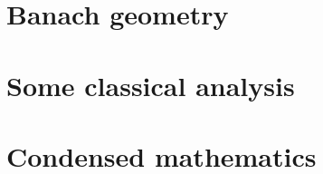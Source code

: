         
        
    \chapter{Banach geometry}
        \begin{abstract}
            
        \end{abstract}
        
        \minitoc
        
        
        
        
        
        
        
    \begin{appendices}
        \chapter{Some classical analysis}
            \begin{abstract}
            
            \end{abstract}
            
            \minitoc
            
            
            
            
            
            
            
        \chapter{Condensed mathematics}
            \begin{abstract}
            
            \end{abstract}
            
            \minitoc
            
            
            
            
            
            
            
    \end{appendices}
	
	\printbibliography

